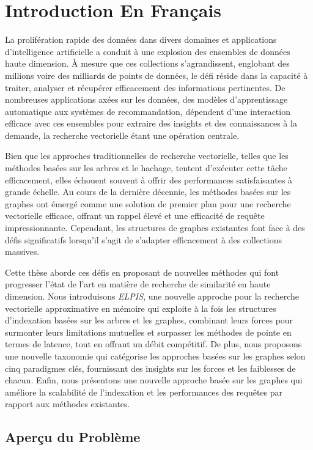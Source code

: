 \chapter*{Introduction En Français}

La prolifération rapide des données dans divers domaines et applications d'intelligence artificielle a conduit à une explosion des ensembles de données haute dimension. À mesure que ces collections s'agrandissent, englobant des millions voire des milliards de points de données, le défi réside dans la capacité à traiter, analyser et récupérer efficacement des informations pertinentes. De nombreuses applications axées sur les données, des modèles d'apprentissage automatique aux systèmes de recommandation, dépendent d'une interaction efficace avec ces ensembles pour extraire des insights et des connaissances à la demande, la recherche vectorielle étant une opération centrale.

Bien que les approches traditionnelles de recherche vectorielle, telles que les méthodes basées sur les arbres et le hachage, tentent d'exécuter cette tâche efficacement, elles échouent souvent à offrir des performances satisfaisantes à grande échelle. Au cours de la dernière décennie, les méthodes basées sur les graphes ont émergé comme une solution de premier plan pour une recherche vectorielle efficace, offrant un rappel élevé et une efficacité de requête impressionnante. Cependant, les structures de graphes existantes font face à des défis significatifs lorsqu'il s'agit de s'adapter efficacement à des collections massives.

Cette thèse aborde ces défis en proposant de nouvelles méthodes qui font progresser l'état de l'art en matière de recherche de similarité en haute dimension. Nous introduisons \textit{ELPIS}, une nouvelle approche pour la recherche vectorielle approximative en mémoire qui exploite à la fois les structures d'indexation basées sur les arbres et les graphes, combinant leurs forces pour surmonter leurs limitations mutuelles et surpasser les méthodes de pointe en termes de latence, tout en offrant un débit compétitif. De plus, nous proposons une nouvelle taxonomie qui catégorise les approches basées sur les graphes selon cinq paradigmes clés, fournissant des insights sur les forces et les faiblesses de chacun. Enfin, nous présentons une nouvelle approche basée sur les graphes qui améliore la scalabilité de l'indexation et les performances des requêtes par rapport aux méthodes existantes.

\section*{Aperçu du Problème}

